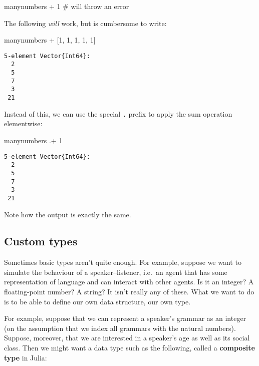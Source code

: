 \documentclass[
  letterpaper,
  DIV=11,
  numbers=noendperiod]{scrartcl}
\newenvironment{Shaded}{\begin{snugshade}}{\end{snugshade}}
\newcommand{\CommentTok}[1]{\textcolor[rgb]{0.37,0.37,0.37}{#1}}
\newcommand{\FloatTok}[1]{\textcolor[rgb]{0.68,0.00,0.00}{#1}}
\newcommand{\NormalTok}[1]{\textcolor[rgb]{0.00,0.23,0.31}{#1}}
\newcommand{\OperatorTok}[1]{\textcolor[rgb]{0.37,0.37,0.37}{#1}}
\begin{document}
\begin{Shaded}
\begin{Highlighting}[]
\NormalTok{manynumbers }\OperatorTok{+} \FloatTok{1} \CommentTok{\# will throw an error}
\end{Highlighting}
\end{Shaded}

The following \emph{will} work, but is cumbersome to write:

\begin{Shaded}
\begin{Highlighting}[]
\NormalTok{manynumbers }\OperatorTok{+}\NormalTok{ [}\FloatTok{1}\NormalTok{, }\FloatTok{1}\NormalTok{, }\FloatTok{1}\NormalTok{, }\FloatTok{1}\NormalTok{, }\FloatTok{1}\NormalTok{]}
\end{Highlighting}
\end{Shaded}

\begin{verbatim}
5-element Vector{Int64}:
  2
  5
  7
  3
 21
\end{verbatim}

Instead of this, we can use the special \texttt{.} prefix to apply the
sum operation elementwise:

\begin{Shaded}
\begin{Highlighting}[]
\NormalTok{manynumbers }\OperatorTok{.+} \FloatTok{1}
\end{Highlighting}
\end{Shaded}

\begin{verbatim}
5-element Vector{Int64}:
  2
  5
  7
  3
 21
\end{verbatim}

Note how the output is exactly the same.

\subsection{Custom types}\label{custom-types}

Sometimes basic types aren't quite enough. For example, suppose we want
to simulate the behaviour of a speaker--listener, i.e.~an agent that has
some representation of language and can interact with other agents. Is
it an integer? A floating-point number? A string? It isn't really any of
these. What we want to do is to be able to define our own data
structure, our own type.

For example, suppose that we can represent a speaker's grammar as an
integer (on the assumption that we index all grammars with the natural
numbers). Suppose, moreover, that we are interested in a speaker's age
as well as its social class. Then we might want a data type such as the
following, called a \textbf{composite type} in Julia:
\end{document}
